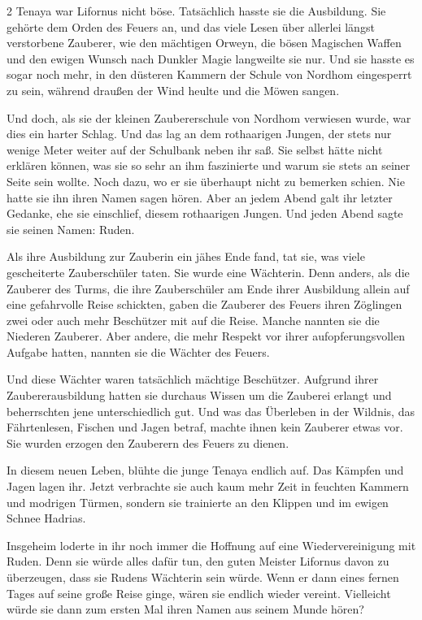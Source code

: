 \documentclass[10pt, a4paper, oneside]{book}
\begin{document}
\begin{multicols}{2}
Tenaya war Lifornus nicht böse. Tatsächlich hasste sie die Ausbildung. Sie gehörte dem Orden des Feuers an, und das viele Lesen über allerlei längst verstorbene Zauberer, wie den mächtigen Orweyn, die bösen Magischen Waffen und den ewigen Wunsch nach Dunkler Magie langweilte sie nur. Und sie hasste es sogar noch mehr, in den düsteren Kammern der Schule von Nordhom eingesperrt zu sein, während draußen der Wind heulte und die Möwen sangen.

Und doch, als sie der kleinen Zaubererschule von Nordhom verwiesen wurde, war dies ein harter Schlag. Und das lag an dem rothaarigen Jungen, der stets nur wenige Meter weiter auf der Schulbank neben ihr saß. Sie selbst hätte nicht erklären können, was sie so sehr an ihm faszinierte und warum sie stets an seiner Seite sein wollte. Noch dazu, wo er sie überhaupt nicht zu bemerken schien. Nie hatte sie ihn ihren Namen sagen hören. Aber an jedem Abend galt ihr letzter Gedanke, ehe sie einschlief, diesem rothaarigen Jungen. Und jeden Abend sagte sie seinen Namen: Ruden.

Als ihre Ausbildung zur Zauberin ein jähes Ende fand, tat sie, was viele gescheiterte Zauberschüler taten. Sie wurde eine Wächterin. Denn anders, als die Zauberer des Turms, die ihre Zauberschüler am Ende ihrer Ausbildung allein auf eine gefahrvolle Reise schickten, gaben die Zauberer des Feuers ihren Zöglingen zwei oder auch mehr Beschützer mit auf die Reise. Manche nannten sie die Niederen Zauberer. Aber andere, die mehr Respekt vor ihrer aufopferungsvollen Aufgabe hatten, nannten sie die Wächter des Feuers.

Und diese Wächter waren tatsächlich mächtige Beschützer. Aufgrund ihrer Zaubererausbildung hatten sie durchaus Wissen um die Zauberei erlangt und beherrschten jene unterschiedlich gut. Und was das Überleben in der Wildnis, das Fährtenlesen, Fischen und Jagen betraf, machte ihnen kein Zauberer etwas vor. Sie wurden erzogen den Zauberern des Feuers zu dienen.

In diesem neuen Leben, blühte die junge Tenaya endlich auf. Das Kämpfen und Jagen lagen ihr. Jetzt verbrachte sie auch kaum mehr Zeit in feuchten Kammern und modrigen Türmen, sondern sie trainierte an den Klippen und im ewigen Schnee Hadrias.

Insgeheim loderte in ihr noch immer die Hoffnung auf eine Wiedervereinigung mit Ruden. Denn sie würde alles dafür tun, den guten Meister Lifornus davon zu überzeugen, dass sie Rudens Wächterin sein würde. Wenn er dann eines fernen Tages auf seine große Reise ginge, wären sie endlich wieder vereint. Vielleicht würde sie dann zum ersten Mal ihren Namen aus seinem Munde hören?


\end{multicols}
\end{document}
